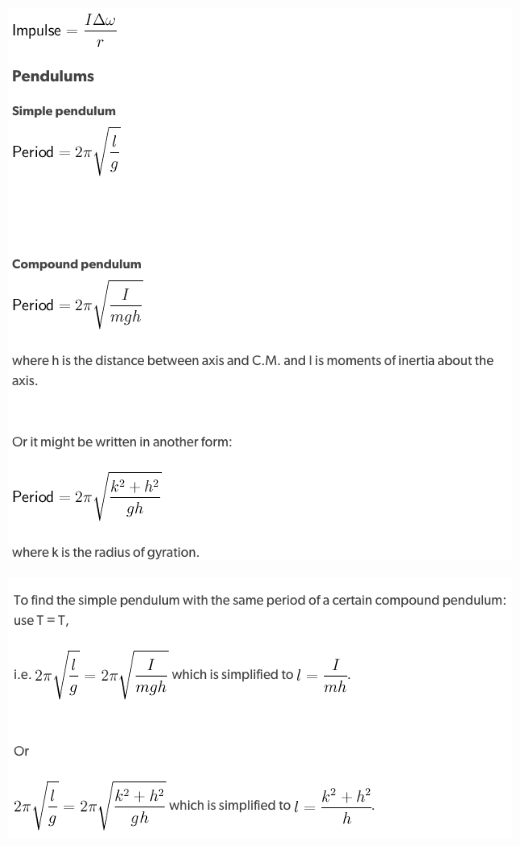 \documentclass[a4paper]{article}
\begin{document}
\begin{center}
    \includegraphics[scale=0.5]{img_M/24_eg5}
\end{center}
\begin{center}
    \includegraphics[scale=0.5]{img_M/24_eg6}
\end{center}



\printindex
\end{document}
